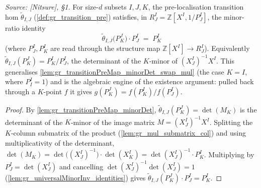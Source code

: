 \begin{lemma}\leanok
  \label{lem:gr_transitionPreMap_minorDet_mul}
  \textit{Source: [Nitsure], \S 1.}
  For size-\(d\) subsets \(I, J, K\), the pre-localisation transition hom
  \(\tilde\theta_{I,J}\) (\cref{def:gr_transition_pre}) satisfies, in \(R^I_J =
  \mathbb{Z}[X^I, 1/P^I_J]\), the minor-ratio identity
  \[
    \tilde\theta_{I,J}\bigl(P^J_K\bigr)\cdot P^I_J \;=\; P^I_K
  \]
  (where \(P^I_J, P^I_K\) are read through the structure map \(\mathbb{Z}[X^I] \to
  R^I_J\)). Equivalently \(\tilde\theta_{I,J}(P^J_K) = P^I_K / P^I_J\), the
  determinant of the \(K\)-minor of \((X^I_J)^{-1} X^I\). This generalises
  \cref{lem:gr_transitionPreMap_minorDet_swap_mul} (the case \(K = I\), where
  \(P^I_I = 1\)) and is the algebraic engine of the existence argument: pulled back
  through a \(K\)-point \(f\) it gives \(g(P^J_K) = f(P^I_K)/f(P^I_J)\).
\end{lemma}
\begin{proof}
    \leanok
  By \cref{lem:gr_transitionPreMap_minorDet}, \(\tilde\theta_{I,J}(P^J_K) =
  \det(M_K)\) is the determinant of the \(K\)-minor of the image matrix \(M =
  (X^I_J)^{-1} X^I\). Splitting the \(K\)-column submatrix of the product
  (\cref{lem:gr_mul_submatrix_col}) and using multiplicativity of the determinant,
  \(\det(M_K) = \det\bigl((X^I_J)^{-1}\bigr)\cdot \det(X^I_K) =
  \det(X^I_J)^{-1}\cdot P^I_K\). Multiplying by \(P^I_J = \det(X^I_J)\) and
  cancelling \(\det(X^I_J)^{-1}\det(X^I_J) = 1\)
  (\cref{lem:gr_universalMinorInv_identities}) gives
  \(\tilde\theta_{I,J}(P^J_K)\cdot P^I_J = P^I_K\).
\end{proof}

